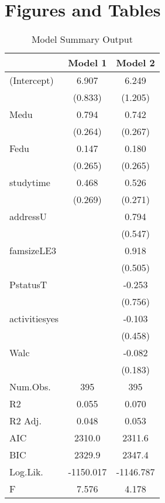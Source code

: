 \documentclass[12pt,english]{article}
\begin{document}
\section{Figures and Tables}
\begin{table}[h]
\begin{center}
\centering
\begin{tabular}[t]{lcc}
\toprule
  & Model 1 & Model 2\\
\midrule
(Intercept) & 6.907 & 6.249\\
 & (0.833) & (1.205)\\
Medu & 0.794 & 0.742\\
 & (0.264) & (0.267)\\
Fedu & 0.147 & 0.180\\
 & (0.265) & (0.265)\\
studytime & 0.468 & 0.526\\
 & (0.269) & (0.271)\\
addressU &  & 0.794\\
 &  & (0.547)\\
famsizeLE3 &  & 0.918\\
 &  & (0.505)\\
PstatusT &  & -0.253\\
 &  & (0.756)\\
activitiesyes &  & -0.103\\
 &  & (0.458)\\
 Walc &  & -0.082\\
 &  & (0.183)\\
\midrule
Num.Obs. & 395 & 395\\
R2 & 0.055 & 0.070\\
R2 Adj. & 0.048 & 0.053\\
AIC & 2310.0 & 2311.6\\
BIC & 2329.9 & 2347.4\\
Log.Lik. & -1150.017 & -1146.787\\
F & 7.576 & 4.178\\
\bottomrule
\end{tabular}
\caption{Model Summary Output}
\label{table:1}
\end{center}
\end{table}
\pagebreak{}
\end{document}
